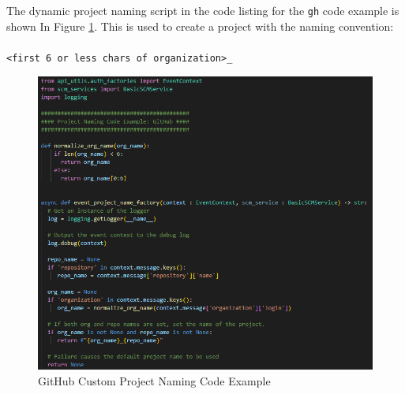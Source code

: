 The dynamic project naming script in the code listing for the \texttt{gh}
code example is shown In Figure \ref{fig:naming-code-gh}.  This is used to create a project with the naming convention:\\\\
\texttt{<first 6 or less chars of organization>\_<repo name>}\\

\begin{figure}[h]
    \includegraphics[width=\textwidth]{graphics/naming-code-gh.png}
    \caption{GitHub Custom Project Naming Code Example}
    \label{fig:naming-code-gh}
\end{figure}
